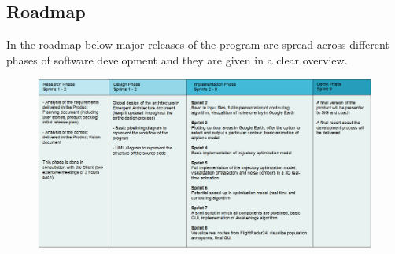 \subsection{Roadmap}
In the roadmap below major releases of the program are spread across different phases of software development and they are given in a clear overview. \\

\begin{figure}[ht]
    \centering
    \includegraphics[width=1.1\textwidth]{images/roadmap}
\end{figure}
\newpage